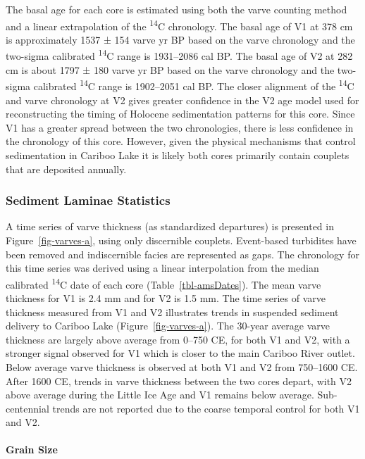 \documentclass[
  letterpaper,
  DIV=11,
  numbers=noendperiod]{scrartcl}
\let\oldparagraph\paragraph
\renewcommand{\paragraph}[1]{\oldparagraph{#1}\mbox{}}
\begin{document}
The basal age for each core is estimated using both the varve counting
method and a linear extrapolation of the \textsuperscript{14}C
chronology. The basal age of V1 at 378 cm is approximately 1537 ± 154
varve yr BP based on the varve chronology and the two-sigma calibrated
\textsuperscript{14}C range is 1931--2086 cal BP. The basal age of V2 at
282 cm is about 1797 ± 180 varve yr BP based on the varve chronology and
the two-sigma calibrated \textsuperscript{14}C range is 1902--2051 cal
BP. The closer alignment of the \textsuperscript{14}C and varve
chronology at V2 gives greater confidence in the V2 age model used for
reconstructing the timing of Holocene sedimentation patterns for this
core. Since V1 has a greater spread between the two chronologies, there
is less confidence in the chronology of this core. However, given the
physical mechanisms that control sedimentation in Cariboo Lake it is
likely both cores primarily contain couplets that are deposited
annually.

\hypertarget{sediment-laminae-statistics}{%
\subsubsection{Sediment Laminae
Statistics}\label{sediment-laminae-statistics}}

A time series of varve thickness (as standardized departures) is
presented in Figure~\ref{fig-varves-a}, using only discernible couplets.
Event-based turbidites have been removed and indiscernible facies are
represented as gaps. The chronology for this time series was derived
using a linear interpolation from the median calibrated
\textsuperscript{14}C date of each core (Table~\ref{tbl-amsDates}). The
mean varve thickness for V1 is 2.4 mm and for V2 is 1.5 mm. The time
series of varve thickness measured from V1 and V2 illustrates trends in
suspended sediment delivery to Cariboo Lake (Figure~\ref{fig-varves-a}).
The 30-year average varve thickness are largely above average from
0--750 CE, for both V1 and V2, with a stronger signal observed for V1
which is closer to the main Cariboo River outlet. Below average varve
thickness is observed at both V1 and V2 from 750--1600 CE. After 1600
CE, trends in varve thickness between the two cores depart, with V2
above average during the Little Ice Age and V1 remains below average.
Sub-centennial trends are not reported due to the coarse temporal
control for both V1 and V2.

\hypertarget{grain-size}{%
\paragraph{Grain Size}\label{grain-size}}
\end{document}

